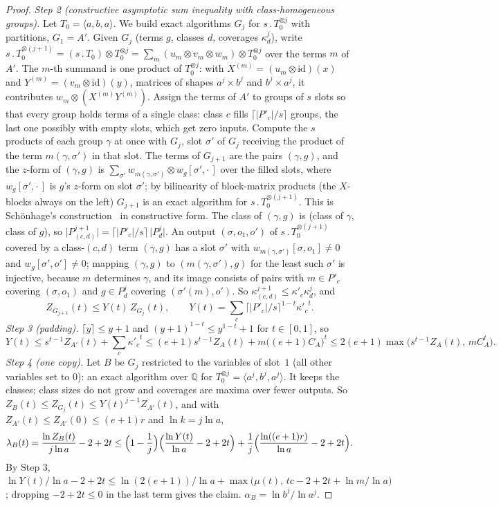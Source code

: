 \documentclass[11pt]{article}
\theoremstyle{definition}
\theoremstyle{remark}
\providecommand{\Q}{\mathbb{Q}}
\newcommand{\abs}[1]{\lvert #1\rvert}
\newcommand{\mat}[3]{\langle #1,#2,#3\rangle} %
\newcommand{\cp}{\mathbin{.}}                 %
\newcommand{\ZB}{Z_B}                         %
\newcommand{\lamB}{\lambda_B}                 %
\newcommand{\alB}{\alpha_B}                   %
\begin{document}
\begin{proof}
\emph{Step 2 (constructive asymptotic sum inequality with class-homogeneous groups).} Let $T_0=\mat aba$. We build exact algorithms $G_j$ for $s\cp T_0^{\otimes j}$ with partitions, $G_1=A'$. Given $G_j$ (terms $g$, classes $d$, coverages $\kappa^j_d$), write $s\cp T_0^{\otimes(j+1)}=(s\cp T_0)\otimes T_0^{\otimes j}=\sum_m(u_m\otimes v_m\otimes w_m)\otimes T_0^{\otimes j}$ over the terms $m$ of $A'$. The $m$-th summand is one product of $T_0^{\otimes j}$: with $X^{(m)}=(u_m\otimes\mathrm{id})(x)$ and $Y^{(m)}=(v_m\otimes\mathrm{id})(y)$, matrices of shapes $a^j\times b^j$ and $b^j\times a^j$, it contributes $w_m\otimes(X^{(m)}Y^{(m)})$. Assign the terms of $A'$ to groups of $s$ slots so that every group holds terms of a single class: class $c$ fills $\lceil\abs{P'_c}/s\rceil$ groups, the last one possibly with empty slots, which get zero inputs. Compute the $s$ products of each group $\gamma$ at once with $G_j$, slot $\sigma'$ of $G_j$ receiving the product of the term $m(\gamma,\sigma')$ in that slot. The terms of $G_{j+1}$ are the pairs $(\gamma,g)$, and the $z$-form of $(\gamma,g)$ is $\sum_{\sigma'}w_{m(\gamma,\sigma')}\otimes w_g[\sigma',\cdot\,]$ over the filled slots, where $w_g[\sigma',\cdot\,]$ is $g$'s $z$-form on slot $\sigma'$; by bilinearity of block-matrix products (the $X$-blocks always on the left) $G_{j+1}$ is an exact algorithm for $s\cp T_0^{\otimes(j+1)}$. This is Schönhage's construction~\cite{Sch81} in constructive form.
The class of $(\gamma,g)$ is (class of $\gamma$, class of $g$), so $\abs{P^{j+1}_{(c,d)}}=\lceil\abs{P'_c}/s\rceil\,\abs{P^j_d}$. An output $(\sigma,o_1,o')$ of $s\cp T_0^{\otimes(j+1)}$ covered by a class-$(c,d)$ term $(\gamma,g)$ has a slot $\sigma'$ with $w_{m(\gamma,\sigma')}[\sigma,o_1]\ne0$ and $w_g[\sigma',o']\ne0$; mapping $(\gamma,g)$ to $(m(\gamma,\sigma'),g)$ for the least such $\sigma'$ is injective, because $m$ determines $\gamma$, and its image consists of pairs with $m\in P'_c$ covering $(\sigma,o_1)$ and $g\in P^j_d$ covering $(\sigma'(m),o')$. So $\kappa^{j+1}_{(c,d)}\le\kappa'_c\kappa^j_d$, and
\[
Z_{G_{j+1}}(t)\le Y(t)\,Z_{G_j}(t),\qquad Y(t)=\sum_c\lceil\abs{P'_c}/s\rceil^{1-t}{\kappa'_c}^t.
\]
\emph{Step 3 (padding).} $\lceil y\rceil\le y+1$ and $(y+1)^{1-t}\le y^{1-t}+1$ for $t\in[0,1]$, so
\[
Y(t)\le s^{t-1}Z_{A'}(t)+\sum_c{\kappa'_c}^t\le(e+1)s^{t-1}Z_A(t)+m\bigl((e+1)C_A\bigr)^t\le2(e+1)\max\bigl(s^{t-1}Z_A(t),\,mC_A^t\bigr).
\]
\emph{Step 4 (one copy).} Let $B$ be $G_j$ restricted to the variables of slot~$1$ (all other variables set to $0$): an exact algorithm over $\Q$ for $T_0^{\otimes j}=\mat{a^j}{b^j}{a^j}$. It keeps the classes; class sizes do not grow and coverages are maxima over fewer outputs. So $\ZB(t)\le Z_{G_j}(t)\le Y(t)^{j-1}Z_{A'}(t)$, and with $Z_{A'}(t)\le Z_{A'}(0)\le(e+1)r$ and $\ln k=j\ln a$,
\[
\lamB(t)=\frac{\ln\ZB(t)}{j\ln a}-2+2t\le\Bigl(1-\frac1j\Bigr)\Bigl(\frac{\ln Y(t)}{\ln a}-2+2t\Bigr)+\frac1j\Bigl(\frac{\ln((e+1)r)}{\ln a}-2+2t\Bigr).
\]
By Step 3, $\ln Y(t)/\ln a-2+2t\le\ln(2(e+1))/\ln a+\max\bigl(\mu(t),\,tc-2+2t+\ln m/\ln a\bigr)$; dropping $-2+2t\le0$ in the last term gives the claim. $\alB=\ln b^j/\ln a^j$.
\end{proof}
\end{document}
